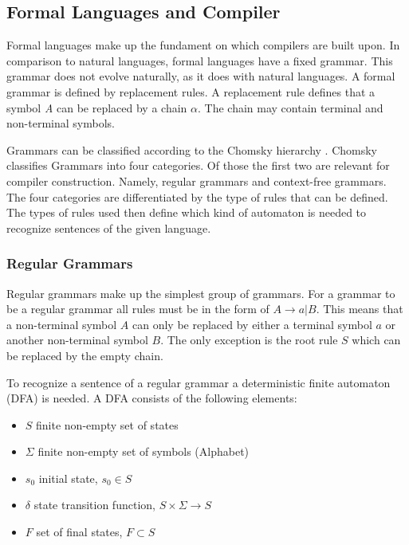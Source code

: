 \subsection{Formal Languages and Compiler}

Formal languages make up the fundament on which compilers are built upon. In comparison to natural languages, formal languages have a fixed grammar. This grammar does not evolve naturally, as it does with natural languages. A formal grammar is defined by replacement rules. A replacement rule defines that a symbol \textit{A} can be replaced by a chain $\alpha$. The chain may contain terminal and non-terminal symbols. 

Grammars can be classified according to the Chomsky hierarchy \parencite{CHOMSKY1959137}. Chomsky classifies Grammars into four categories. Of those the first two are relevant for compiler construction. Namely, regular grammars and context-free grammars. The four categories are differentiated by the type of rules that can be defined. The types of rules used then define which kind of automaton is needed to recognize sentences of the given language. 

\subsubsection{Regular Grammars}

Regular grammars make up the simplest group of grammars. For a grammar to be a regular grammar all rules must be in the form of $A\rightarrow a | B$. This means that a non-terminal symbol $A$ can only be replaced by either a terminal symbol $a$ or another non-terminal symbol $B$. The only exception is the root rule $S$ which can be replaced by the empty chain. 

To recognize a sentence of a regular grammar a deterministic finite automaton (DFA) is needed. A DFA consists of the following elements:

\begin{itemize}
    \item $S$ finite non-empty set of states
    \item $\Sigma$ finite non-empty set of symbols (Alphabet)
    \item $s_0$ initial state, $s_0 \in S$
    \item $\delta$ state transition function, $S \times \Sigma \rightarrow S$
    \item $F$ set of final states, $F \subset S$
\end{itemize}

